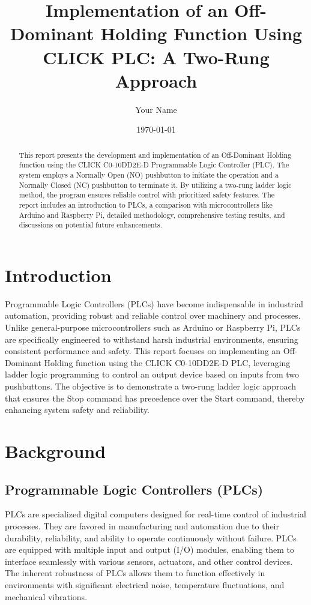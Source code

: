 \documentclass[12pt]{article}
\title{Implementation of an Off-Dominant Holding Function Using CLICK PLC: A Two-Rung Approach}
\author{Your Name}
\date{\today}
\begin{document}
\maketitle

\begin{abstract}
This report presents the development and implementation of an Off-Dominant Holding function using the CLICK C0-10DD2E-D Programmable Logic Controller (PLC). The system employs a Normally Open (NO) pushbutton to initiate the operation and a Normally Closed (NC) pushbutton to terminate it. By utilizing a two-rung ladder logic method, the program ensures reliable control with prioritized safety features. The report includes an introduction to PLCs, a comparison with microcontrollers like Arduino and Raspberry Pi, detailed methodology, comprehensive testing results, and discussions on potential future enhancements.
\end{abstract}

\tableofcontents

\section{Introduction}

Programmable Logic Controllers (PLCs) have become indispensable in industrial automation, providing robust and reliable control over machinery and processes. Unlike general-purpose microcontrollers such as Arduino or Raspberry Pi, PLCs are specifically engineered to withstand harsh industrial environments, ensuring consistent performance and safety. This report focuses on implementing an Off-Dominant Holding function using the CLICK C0-10DD2E-D PLC, leveraging ladder logic programming to control an output device based on inputs from two pushbuttons. The objective is to demonstrate a two-rung ladder logic approach that ensures the Stop command has precedence over the Start command, thereby enhancing system safety and reliability.

\section{Background}

\subsection{Programmable Logic Controllers (PLCs)}

PLCs are specialized digital computers designed for real-time control of industrial processes. They are favored in manufacturing and automation due to their durability, reliability, and ability to operate continuously without failure. PLCs are equipped with multiple input and output (I/O) modules, enabling them to interface seamlessly with various sensors, actuators, and other control devices. The inherent robustness of PLCs allows them to function effectively in environments with significant electrical noise, temperature fluctuations, and mechanical vibrations.
\end{document}
